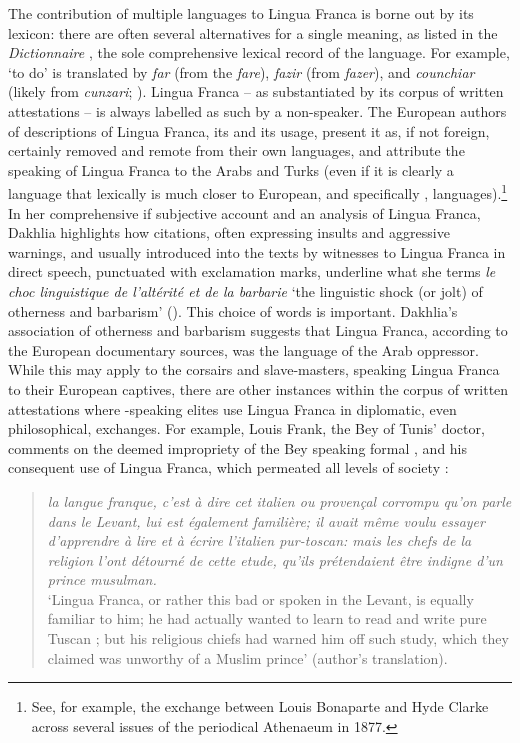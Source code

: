\documentclass[output=paper]{langsci/langscibook}
\begin{document}
	The contribution of multiple languages to Lingua Franca is borne out by its lexicon: there are often several alternatives for a single meaning, as listed in the \textit{Dictionnaire} \citep{Anonymous1830}, the sole comprehensive lexical record of the language. For example, ‘to do’ is translated by \textit{far} (from the  \textit{fare}), \textit{fazir} (from  \textit{fazer}), and \textit{counchiar} (likely from  \textit{cunzari}; \citealt[316]{Cifoletti2004}). Lingua Franca – as substantiated by its corpus of written attestations – is always labelled as such by a non-speaker. The European authors of descriptions of Lingua Franca, its  and its usage, present it as, if not foreign, certainly removed and remote from their own languages, and attribute the speaking of Lingua Franca to the Arabs and Turks (even if it is clearly a language that lexically is much closer to European, and specifically , languages).\footnote{See, for example, the exchange between Louis Bonaparte and Hyde Clarke across several issues of the periodical Athenaeum in 1877.} In her comprehensive if subjective account and an  analysis of Lingua Franca, Dakhlia highlights how citations, often expressing insults and aggressive warnings, and usually introduced into the texts by witnesses to Lingua Franca in direct speech, punctuated with exclamation marks, underline what she terms \textit{le choc linguistique de l’altérité et de la barbarie} ‘the linguistic shock (or jolt) of otherness and barbarism’ (\citealt[351]{Dakhlia2008}). This choice of words is important. Dakhlia’s association of otherness and barbarism suggests that Lingua Franca, according to the European documentary sources, was the language of the Arab oppressor. While this may apply to the corsairs and slave-masters, speaking Lingua Franca to their European captives, there are other instances within the corpus of written attestations where -speaking elites use Lingua Franca in diplomatic, even philosophical, exchanges. For example, Louis Frank, the Bey of Tunis’ doctor, comments on the deemed impropriety of the Bey speaking formal , and his consequent use of Lingua Franca, which permeated all levels of society \citep[70]{Frank1850}:
	
	\begin{quote}
		\textit{la langue franque, c’est à dire cet italien ou provençal corrompu qu’on parle dans le Levant, lui est également familière; il avait même voulu essayer d’ap\-prendre à lire et à écrire l’italien pur-toscan: mais les chefs de la religion l’ont détourné de cette etude, qu’ils prétendaient être indigne d’un prince musulman.}\medskip\\
		‘Lingua Franca, or rather this bad  or  spoken in the Levant, is equally familiar to him; he had actually wanted to learn to read and write  pure Tuscan ; but his religious chiefs had warned him off such study, which they claimed was unworthy of a Muslim prince’ (author's translation).
	\end{quote}
	
\end{document}
